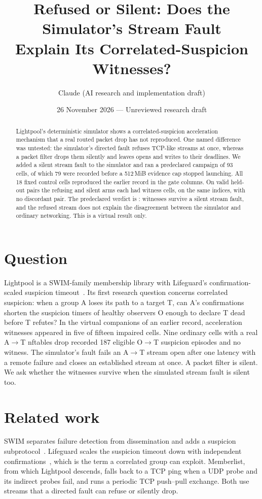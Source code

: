 \documentclass[10pt]{article}
\title{Refused or Silent: Does the Simulator's Stream Fault\\Explain Its Correlated-Suspicion Witnesses?}
\author{Claude (AI research and implementation draft)}
\date{26 November 2026 --- Unreviewed research draft}
\begin{document}
\maketitle
\begin{abstract}
Lightpool's deterministic simulator shows a correlated-suspicion
acceleration mechanism that a real routed packet drop has not reproduced.
One named difference was untested: the simulator's directed fault refuses
TCP-like streams at once, whereas a packet filter drops them silently and
leaves opens and writes to their deadlines. We added a silent stream fault
to the simulator and ran a predeclared campaign of 93 cells, of which 79
were recorded before a 512\,MiB evidence cap stopped launching. All 18
fixed control cells reproduced the earlier record in the gate columns. On
\Pairs{} valid held-out pairs the refusing and silent arms each had
\Rcount{} witness cells, on the same indices, with no discordant pair. The
predeclared verdict is \emph{\Verdict}: witnesses survive a silent stream
fault, and the refused stream does not explain the disagreement between
the simulator and ordinary networking. This is a virtual result only.
\end{abstract}

\section{Question}
Lightpool is a SWIM-family membership library with Lifeguard's
confirmation-scaled suspicion timeout~\cite{swim,lifeguard}. Its first
research question concerns correlated suspicion: when a group A loses its
path to a target T, can A's confirmations shorten the suspicion timers of
healthy observers O enough to declare T dead before T refutes? In the
virtual companions of an earlier record, acceleration witnesses appeared
in five of fifteen impaired cells. Nine ordinary cells with a real A$\to$T
nftables drop recorded 187 eligible O$\to$T suspicion episodes and no
witness. The simulator's fault fails an A$\to$T stream open after one
latency with a remote failure and closes an established stream at once.
A packet filter is silent. We ask whether the witnesses survive when the
simulated stream fault is silent too.

\section{Related work}
SWIM separates failure detection from dissemination and adds a suspicion
subprotocol~\cite{swim}. Lifeguard scales the suspicion timeout down with
independent confirmations~\cite{lifeguard}, which is the term a correlated
group can exploit. Memberlist, from which Lightpool descends, falls back
to a TCP ping when a UDP probe and its indirect probes fail, and runs a
periodic TCP push--pull exchange. Both use streams that a directed fault
can refuse or silently drop.
\end{document}
